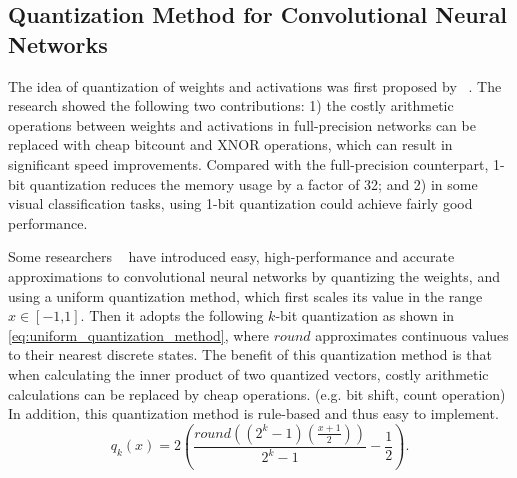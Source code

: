 \documentclass[twoside,twocolumn]{article}
\begin{document}
\subsection{Quantization Method for Convolutional Neural Networks}
The idea of quantization of weights and activations was first proposed by ~\cite{b16}. The research showed the following two contributions: 1) the costly arithmetic operations between weights and activations in full-precision networks can be replaced with cheap bitcount and XNOR operations, which can result in significant speed improvements. Compared with the full-precision counterpart, 1-bit quantization reduces the memory usage by a factor of 32; and 2) in some visual classification tasks, using 1-bit quantization could achieve fairly good performance.

Some researchers ~\cite{b17,b38} have introduced easy, high-performance and accurate approximations to convolutional neural networks by quantizing the weights, and using a uniform quantization method, which first scales its value in the range $x\in[-\text{1,}\text{1}]$. Then it adopts the following $k$-bit quantization as shown in \eqref{eq:uniform_quantization_method}, where $round$ approximates continuous values to their nearest discrete states. The benefit of this quantization method is that when calculating the inner product of two quantized vectors, costly arithmetic calculations can be replaced by cheap operations. (e.g. bit shift, count operation) In addition, this quantization method is rule-based and thus easy to implement.
\begin{equation}\label{eq:uniform_quantization_method}
q_k\left( x \right) =2\left( \frac{round\left( \left( 2^k-1 \right) \left( \frac{x+1}{2} \right) \right)}{2^k-1}-\frac{1}{2} \right).
\end{equation}
\end{document}
